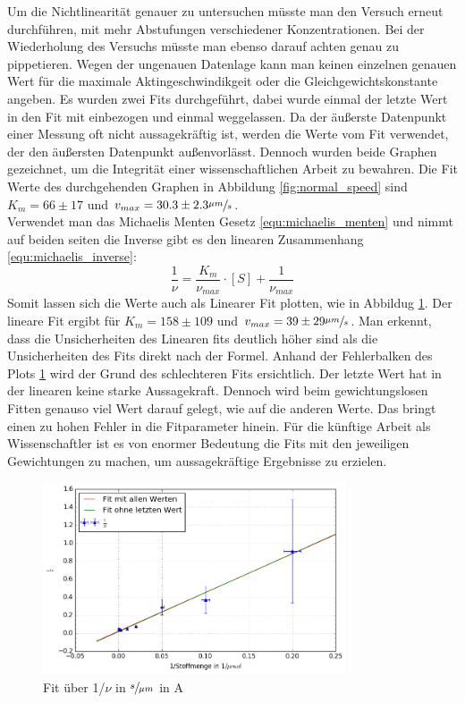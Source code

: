 Um die Nichtlinearität genauer zu untersuchen müsste man den Versuch erneut durchführen, 
mit mehr Abstufungen verschiedener Konzentrationen.
Bei der Wiederholung des Versuchs müsste man ebenso darauf achten genau zu pippetieren.
Wegen der ungenauen Datenlage kann man keinen einzelnen genauen Wert für die maximale
Aktingeschwindikgeit oder die Gleichgewichtskonstante angeben.
Es wurden zwei Fits durchgeführt, dabei wurde einmal der letzte Wert in den Fit mit einbezogen und einmal weggelassen. Da der äußerste Datenpunkt einer Messung oft nicht aussagekräftig ist,
werden die Werte vom Fit verwendet, der den äußersten Datenpunkt außenvorlässt.
Dennoch wurden beide Graphen gezeichnet, um die Integrität einer wissenschaftlichen Arbeit zu bewahren.
Die Fit Werte des durchgehenden Graphen in Abbildung \ref{fig:normal_speed} sind $K_m = 66 \pm 17$ und $v_{max} = 30.3 \pm 2.3 \sfrac{\mu m}{s}$.\\ 
Verwendet man das Michaelis Menten Gesetz \ref{equ:michaelis_menten} und nimmt auf beiden seiten die Inverse gibt es den linearen Zusammenhang \ref{equ:michaelis_inverse}:
\begin{equation}
  \frac{1}{\nu} = \frac{K_m}{\nu_{max}} \cdot [S] + \frac{1}{\nu_{max}}
  \label{equ:michaelis_inverse}
\end{equation}
Somit lassen sich die Werte auch als Linearer Fit plotten, wie in Abbildug \ref{fig:1_over_speed}.
Der lineare Fit ergibt für $K_m = 158 \pm 109$ und $v_{max} = 39 \pm 29 \sfrac{\mu m}{s}$.
Man erkennt, dass die Unsicherheiten des Linearen fits
deutlich höher sind als die Unsicherheiten des Fits direkt nach der Formel.
Anhand der Fehlerbalken des Plots \ref{fig:1_over_speed} wird der Grund des schlechteren Fits ersichtlich. Der letzte Wert hat in der linearen keine starke Aussagekraft. Dennoch wird beim gewichtungslosen Fitten genauso viel Wert darauf gelegt, wie auf die anderen Werte.
Das bringt einen zu hohen Fehler in die Fitparameter hinein.
Für die künftige Arbeit als Wissenschaftler ist es von enormer Bedeutung die Fits mit den jeweiligen
Gewichtungen zu machen, um aussagekräftige Ergebnisse zu erzielen.
\begin{figure}[]
  \centering
  \includegraphics[width=0.8\textwidth]{bilder/both_fits_1over.png}
  \caption{Fit über 1/$\nu$  in $\sfrac{s}{\mu m}$ in A}
  \label{fig:1_over_speed}
\end{figure}

